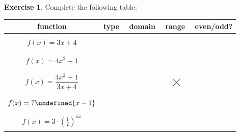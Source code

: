 \documentclass[11pt,reqno,final]{amsart}
\makeatletter
\let\sqrt=\undefined
\DeclareRobustCommand\sqrt{\@ifnextchar[\@sqrt{\mathpalette\@x@sqrt}}
\def\@x@sqrt#1#2{%
 \setbox\z@\hbox{$\m@th#1\sqrtsign{\mkern1mu #2}$}
 \mkern3mu\box\z@}
\numberwithin{equation}{section}
\numberwithin{figure}{section}
\theoremstyle{definition} %
\newtheorem{exercise}[question]{Exercise}
\makeatother
\begin{document}
\begin{exercise}
        Complete the following table:\\
        \begin{center}
                {
                  \renewcommand{\arraystretch}{1.5}%
                  \begin{tabular}{c||c|c|c|c}
                    function & \qquad type \qquad $ $ & \qquad domain \qquad $ $& \qquad range \qquad $ $ & even/odd?\\ \hline\hline
                             &&&& \\
                    $f(x) = 3x+4$ &&&& \\
                             &&&& \\ \hline
                             &&&& \\
                    $f(x) = 4x^2+1$ &&&& \\
                             &&&& \\ \hline
                             &&&& \\
                    $f(x) = \dfrac{4x^2+1}{3x+4}$ &&& $\bigtimes$ & \\
                             &&&& \\\hline
                             &&&& \\
                    $f(x) = 7\sqrt{x-1}$ &&&& \\
                             &&&& \\ \hline
                             &&&& \\
                    $f(x) = 3 \cdot \left(\frac{1}{2}\right)^{\pi x}$ &&&& \\
                             &&&& 
                  \end{tabular}
                }
        \end{center}
\end{exercise}
\end{document}
